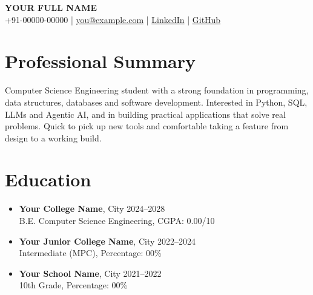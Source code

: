 \documentclass[10.5pt,letterpaper]{article}
\begin{document}

\begin{center}
{\large \textbf{YOUR FULL NAME}} \\[2pt]

{\small
+91-00000-00000 \;|\;
\href{mailto:you@example.com}{you@example.com} \;|\;
\href{https://www.linkedin.com/in/your-profile/}{LinkedIn} \;|\;
\href{https://github.com/your-username}{GitHub}
}
\end{center}

\vspace{2pt}


\section{Professional Summary}

Computer Science Engineering student with a strong foundation in
programming, data structures, databases and software development.
Interested in Python, SQL, LLMs and Agentic AI, and in building
practical applications that solve real problems. Quick to pick up new
tools and comfortable taking a feature from design to a working build.


\section{Education}

\begin{itemize}

\item
\textbf{Your College Name}, City
\hfill 2024--2028 \\
B.E. Computer Science Engineering, CGPA: 0.00/10

\item
\textbf{Your Junior College Name}, City
\hfill 2022--2024 \\
Intermediate (MPC), Percentage: 00\%

\item
\textbf{Your School Name}, City
\hfill 2021--2022 \\
10th Grade, Percentage: 00\%

\end{itemize}
\end{document}
